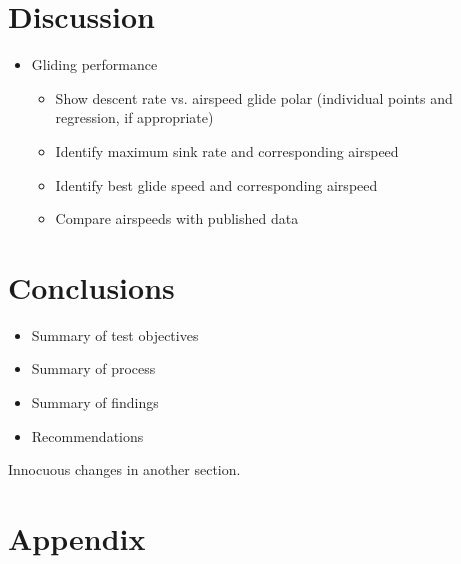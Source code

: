 \documentclass[conf]{new-aiaa}
\begin{document}
\section{Discussion}

\begin{itemize}
	\item Gliding performance
	\begin{itemize}
		\item Show descent rate vs. airspeed glide polar (individual points and regression, if appropriate)
		\item Identify maximum sink rate and corresponding airspeed
		\item Identify best glide speed and corresponding airspeed
		\item Compare airspeeds with published data
	\end{itemize}
\end{itemize}

\section{Conclusions}

\begin{itemize}
	\item Summary of test objectives
	\item Summary of process
	\item Summary of findings
	\item Recommendations
\end{itemize}

Innocuous changes in another section.

\section{Appendix}


\end{document}
